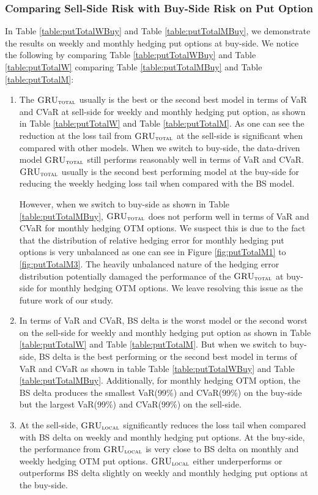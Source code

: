 \documentclass[letterpaper,12pt,titlepage,oneside,final]{book}
\numberwithin{equation}{section}
\theoremstyle{definition}
\newcommand{\modelT}{\textsc{GRU}_{\textsc{total}}}
\newcommand{\modelL}{\textsc{GRU}_{\textsc{local}}}
\begin{document}
\subsubsection{Comparing Sell-Side Risk with Buy-Side Risk on Put Option}
In Table \ref{table:putTotalWBuy} and  Table \ref{table:putTotalMBuy},  we demonstrate the results on weekly and monthly hedging put options at buy-side. We notice the following by comparing Table \ref{table:putTotalWBuy} and  Table \ref{table:putTotalW} comparing Table \ref{table:putTotalMBuy} and  Table \ref{table:putTotalM}:
\begin{enumerate}
	\item The $\modelT$ usually is the best or the second best model in terms of VaR and CVaR  at sell-side for weekly and monthly hedging put option,  as shown in Table \ref{table:putTotalW} and Table \ref{table:putTotalM}. As one can see the reduction at the loss tail from $\modelT$ at the sell-side is significant when compared with other models. When we switch to buy-side, the data-driven model $\modelT$ still performs reasonably well in terms of VaR and CVaR. $\modelT$ usually is the second best performing model at the buy-side for reducing the weekly hedging loss tail when compared with the BS model.
	
	However, when we switch to buy-side as shown in Table \ref{table:putTotalMBuy},  $\modelT$ does not perform well in terms of VaR and CVaR for monthly hedging OTM options. We suspect this is due to the fact that the distribution of relative hedging error for monthly hedging put options is very unbalanced as one can see in Figure \ref{fig:putTotalM1} to \ref{fig:putTotalM3}. The heavily unbalanced nature of the hedging error distribution potentially damaged the performance of the $\modelT$ at buy-side for monthly hedging OTM options.  We leave resolving this issue as the future work of our study.
	
\item	 In terms of VaR and CVaR, BS delta is the worst model or the second worst on the sell-side for weekly  and monthly hedging  put option as shown in Table \ref{table:putTotalW} and Table \ref{table:putTotalM}. But when we switch to buy-side,   BS delta is the best performing or the second best  model in terms of VaR and CVaR as shown in table  Table \ref{table:putTotalWBuy} and Table \ref{table:putTotalMBuy}. Additionally, for monthly hedging OTM option, the BS delta produces the smallest VaR(99\%) and CVaR(99\%) on the buy-side but the largest VaR(99\%) and CVaR(99\%) on the sell-side.
\item	 At the sell-side,  $\modelL$ significantly reduces the loss tail when compared with BS delta on weekly and monthly hedging put options.
 At the buy-side, the performance from $\modelL$ is very close to BS delta on monthly and weekly hedging OTM put options.  $\modelL$ either underperforms or outperforms BS delta slightly on weekly and monthly hedging put options at the buy-side.


\end{enumerate}
\end{document}

